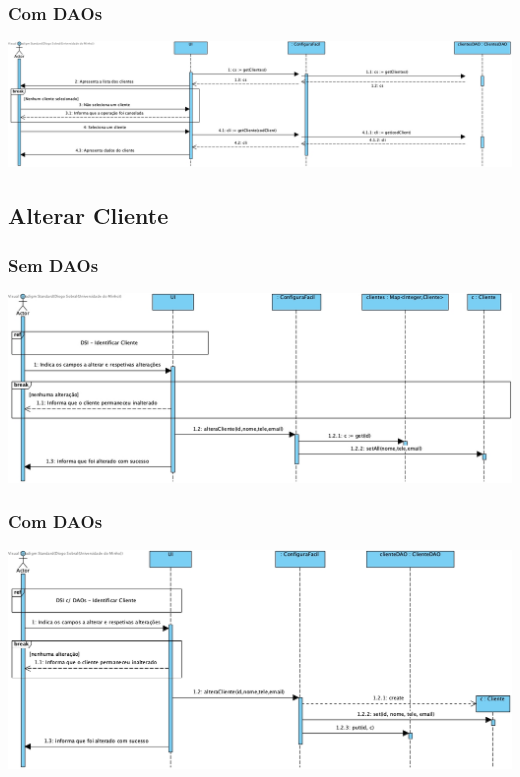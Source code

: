 \subsubsection{Com DAOs}
\begin{center}
 	\includegraphics[width = 5.5in]{DSI_D/DSI-DAOs-Identificar_Cliente.jpg}
\end{center}


\subsection{Alterar Cliente}
\subsubsection{Sem DAOs}
\begin{center}
 	\includegraphics[width = 5.5in]{DSI/DSI-Alterar_Cliente.jpg}
\end{center}
\subsubsection{Com DAOs}
\begin{center}
 	\includegraphics[width = 5.5in]{DSI_D/DSI-DAOs-Alterar_Cliente.jpg}
\end{center}


